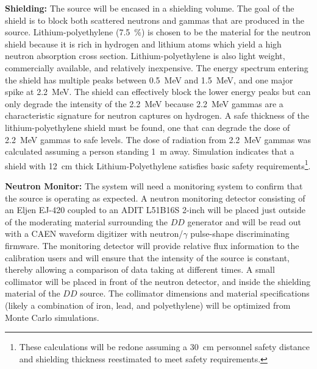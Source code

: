 {\bf Shielding:} The source will be encased in a shielding volume. The goal of the shield is to block both scattered neutrons and gammas that are produced in the source. Lithium-polyethylene (\SI{7.5}{\%}) is chosen to be the material for the neutron shield because it is rich in hydrogen and lithium atoms which yield a high neutron absorption cross section. Lithium-polyethylene is also light weight, commercially available, and relatively inexpensive. The energy spectrum entering the shield has multiple peaks between \SI{0.5}{\MeV} and \SI{1.5}{\MeV}, and one major spike at \SI{2.2}{\MeV}. The shield can effectively block the lower energy peaks but can only degrade the intensity of the \SI{2.2}{\MeV} because \SI{2.2}{\MeV} gammas are a characteristic signature for neutron captures on hydrogen. A safe thickness of the lithium-polyethylene shield must be found, one that can degrade the dose of \SI{2.2}{\MeV} gammas to safe levels. The dose of radiation from \SI{2.2}{\MeV} gammas was calculated assuming a person standing \SI{1}{\m} away. Simulation indicates that a shield with \SI{12}{\cm} thick Lithium-Polyethylene satisfies basic safety requirements\footnote{These calculations will be redone assuming a \SI{30}{\cm} personnel safety distance and shielding thickness reestimated to meet  safety requirements.}. 
 
{\bf Neutron Monitor:} The system will need a monitoring system to confirm that the source is operating as expected.  A neutron monitoring detector consisting of an Eljen EJ-420 coupled to an ADIT L51B16S \num{2}-inch  will be placed just outside of the moderating material surrounding the $DD$ generator and will be read out with a CAEN waveform digitizer with neutron/$\gamma$ pulse-shape discriminating firmware. The monitoring detector will provide relative flux information to the calibration users and will ensure that the intensity of the source is constant, thereby allowing a comparison of data taking at different times.  A small collimator will be placed in front of the neutron detector, and inside the shielding material of the $DD$ source. The collimator dimensions and material specifications (likely a combination of iron, lead, and polyethylene) will be optimized from Monte Carlo simulations.

